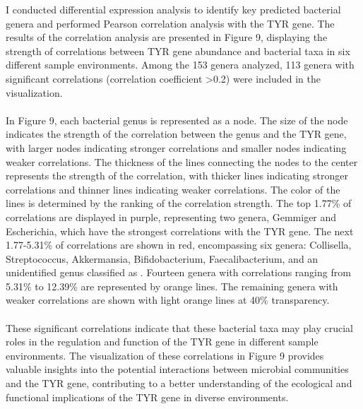 \documentclass[12pt]{article}
\begin{document}
I conducted differential expression analysis to identify key predicted bacterial genera and performed Pearson correlation analysis with the TYR gene. The results of the correlation analysis are presented in Figure 9, displaying the strength of correlations between TYR gene abundance and bacterial taxa in six different sample environments. Among the 153 genera analyzed, 113 genera with significant correlations (correlation coefficient  \textgreater 0.2) were included in the visualization.\\\\
In Figure 9, each bacterial genus is represented as a node. The size of the node indicates the strength of the correlation between the genus and the TYR gene, with larger nodes indicating stronger correlations and smaller nodes indicating weaker correlations. The thickness of the lines connecting the nodes to the center represents the strength of the correlation, with thicker lines indicating stronger correlations and thinner lines indicating weaker correlations. The color of the lines is determined by the ranking of the correlation strength. The top 1.77\% of correlations are displayed in purple, representing two genera, Gemmiger and Escherichia, which have the strongest correlations with the TYR gene. The next 1.77-5.31\% of correlations are shown in red, encompassing six genera: Collisella, Streptococcus, Akkermansia, Bifidobacterium, Faecalibacterium, and an unidentified genus classified as . Fourteen genera with correlations ranging from 5.31\% to 12.39\% are represented by orange lines. The remaining genera with weaker correlations are shown with light orange lines at 40\% transparency.\\\\
These significant correlations indicate that these bacterial taxa may play crucial roles in the regulation and function of the TYR gene in different sample environments. The visualization of these correlations in Figure 9 provides valuable insights into the potential interactions between microbial communities and the TYR gene, contributing to a better understanding of the ecological and functional implications of the TYR gene in diverse environments.
\end{document}
